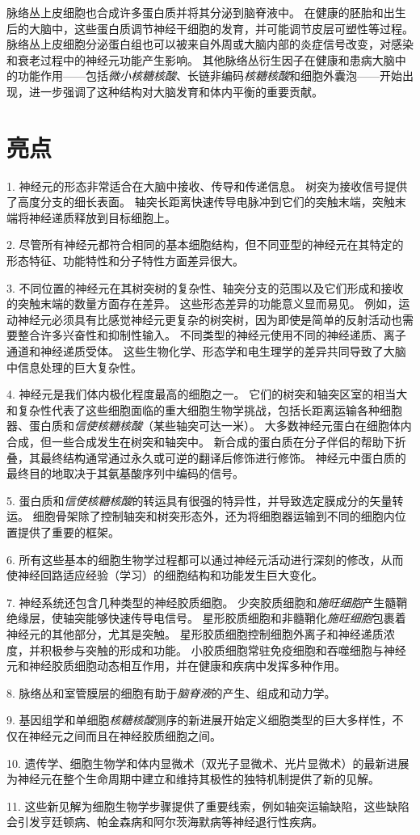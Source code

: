 脉络丛上皮细胞也合成许多蛋白质并将其分泌到脑脊液中。
在健康的胚胎和出生后的大脑中，这些蛋白质调节神经干细胞的发育，并可能调节皮层可塑性等过程。
脉络丛上皮细胞分泌蛋白组也可以被来自外周或大脑内部的炎症信号改变，对感染和衰老过程中的神经元功能产生影响。
其他脉络丛衍生因子在健康和患病大脑中的功能作用——包括\textit{微小核糖核酸}、长链非编码\textit{核糖核酸}和细胞外囊泡——开始出现，进一步强调了这种结构对大脑发育和体内平衡的重要贡献。



\section{亮点}

1. 神经元的形态非常适合在大脑中接收、传导和传递信息。
树突为接收信号提供了高度分支的细长表面。
轴突长距离快速传导电脉冲到它们的突触末端，突触末端将神经递质释放到目标细胞上。


2. 尽管所有神经元都符合相同的基本细胞结构，但不同亚型的神经元在其特定的形态特征、功能特性和分子特性方面差异很大。


3. 不同位置的神经元在其树突树的复杂性、轴突分支的范围以及它们形成和接收的突触末端的数量方面存在差异。
这些形态差异的功能意义显而易见。
例如，运动神经元必须具有比感觉神经元更复杂的树突树，因为即使是简单的反射活动也需要整合许多兴奋性和抑制性输入。
不同类型的神经元使用不同的神经递质、离子通道和神经递质受体。
这些生物化学、形态学和电生理学的差异共同导致了大脑中信息处理的巨大复杂性。


4. 神经元是我们体内极化程度最高的细胞之一。
它们的树突和轴突区室的相当大和复杂性代表了这些细胞面临的重大细胞生物学挑战，包括长距离运输各种细胞器、蛋白质和\textit{信使核糖核酸}（某些轴突可达一米）。
大多数神经元蛋白在细胞体内合成，但一些合成发生在树突和轴突中。
新合成的蛋白质在分子伴侣的帮助下折叠，其最终结构通常通过永久或可逆的翻译后修饰进行修饰。
神经元中蛋白质的最终目的地取决于其氨基酸序列中编码的信号。


5. 蛋白质和\textit{信使核糖核酸}的转运具有很强的特异性，并导致选定膜成分的矢量转运。
细胞骨架除了控制轴突和树突形态外，还为将细胞器运输到不同的细胞内位置提供了重要的框架。


6. 所有这些基本的细胞生物学过程都可以通过神经元活动进行深刻的修改，从而使神经回路适应经验（学习）的细胞结构和功能发生巨大变化。


7. 神经系统还包含几种类型的神经胶质细胞。
少突胶质细胞和\textit{施旺细胞}产生髓鞘绝缘层，使轴突能够快速传导电信号。
星形胶质细胞和非髓鞘化\textit{施旺细胞}包裹着神经元的其他部分，尤其是突触。 
星形胶质细胞控制细胞外离子和神经递质浓度，并积极参与突触的形成和功能。
小胶质细胞常驻免疫细胞和吞噬细胞与神经元和神经胶质细胞动态相互作用，并在健康和疾病中发挥多种作用。


8. 脉络丛和室管膜层的细胞有助于\textit{脑脊液}的产生、组成和动力学。


9. 基因组学和单细胞\textit{核糖核酸}测序的新进展开始定义细胞类型的巨大多样性，不仅在神经元之间而且在神经胶质细胞之间。


10. 遗传学、细胞生物学和体内显微术（双光子显微术、光片显微术）的最新进展为神经元在整个生命周期中建立和维持其极性的独特机制提供了新的见解。


11. 这些新见解为细胞生物学步骤提供了重要线索，例如轴突运输缺陷，这些缺陷会引发亨廷顿病、帕金森病和阿尔茨海默病等神经退行性疾病。



